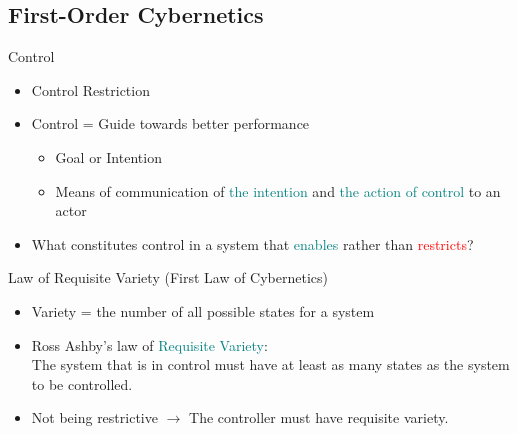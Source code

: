 \documentclass[
	11pt,
	aspectratio=169,
]{beamer}
\begin{document}
        \subsection{First-Order Cybernetics}
            \begin{frame}{Control}
                \begin{itemize}
                    \item<1-> Control \neq Restriction
                    \item<2-> Control = Guide towards better performance
                    \begin{itemize}
                        \item Goal or Intention
                        \item Means of communication of \textcolor{teal}{the intention} and \textcolor{teal}{the action of control} to an actor
                    \end{itemize}
                    \item<3-> What constitutes control in a system that \textcolor{teal}{enables} rather than \textcolor{red}{restricts}?
                \end{itemize}
            \end{frame}
            \begin{frame}{Law of Requisite Variety (First Law of Cybernetics)}
                \begin{itemize}
                    \item<1-> Variety = the number of all possible states for a system
                    \item<2-> Ross Ashby's law of \textcolor{teal}{Requisite Variety}: \\
                        The system that is in control must have at least as many states as the system to be controlled.
                    \item<3-> Not being restrictive $\longrightarrow$ The controller must have requisite variety.
                \end{itemize}
            \end{frame}
\end{document}
